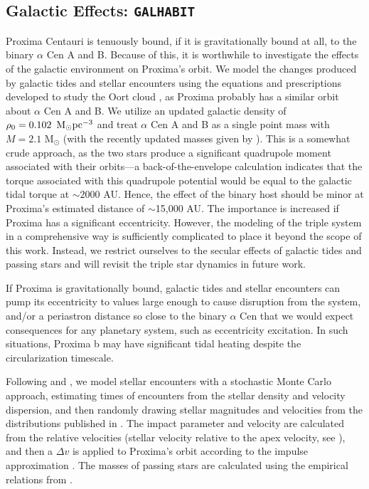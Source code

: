 \documentclass[preprint,12pt]{aastex}
\def\msun{{\rm\,M_\odot}}
\def\eg{{\it e.g.\ }}
\def\galhabit{\texttt{\footnotesize{GALHABIT}}\xspace}
\begin{document}
\subsection{Galactic Effects: \galhabit}
\label{sec:models:galhabit}
Proxima Centauri is tenuously bound, if it is gravitationally bound at all, to 
the binary $\alpha$ Cen A and B. Because of this, it is worthwhile
to investigate the effects of the galactic environment on 
Proxima's orbit. We model the changes produced by galactic tides 
and stellar encounters using the equations and prescriptions 
developed to study the Oort cloud \citep{Heisler1986, Heisler1987, Rickman2008}, as Proxima probably has a similar orbit about $\alpha$ Cen A and B. We utilize an updated galactic 
density of $\rho_0 = 0.102~\msun \rm{pc}^{-3}$ \citep{Holmberg2000} and treat 
$\alpha$ Cen A and B as a single point mass with $M = 2.1$ 
M$_{\odot}$ (with the recently updated masses given by 
\cite{PourbaixBoffin16}). This is a somewhat crude approach, as 
the two stars produce a significant quadrupole moment associated 
with their orbits---a back-of-the-envelope calculation indicates
that the torque associated with this quadrupole potential would 
be equal to the galactic tidal torque at $\sim 2000$ AU. Hence, 
the effect of the binary host should be minor 
at Proxima's estimated distance of $\sim$15,000 AU. The importance is increased if Proxima 
has a significant eccentricity. However, the modeling of the
triple system in a comprehensive way is sufficiently complicated
\citep[see, \eg][]{Harrington1968, Ford2000} to place it beyond 
the scope of this work. Instead, we restrict ourselves to the 
secular effects of galactic tides and passing stars 
and will revisit the triple star dynamics in future work. 

If Proxima is gravitationally bound, galactic tides and stellar 
encounters can pump its eccentricity to values large enough to 
cause disruption from the system, and/or a periastron distance 
so close to the binary $\alpha$ Cen that we would expect 
consequences for any planetary system, such as eccentricity 
excitation. In such situations, Proxima b may have significant tidal 
heating despite the circularization timescale. 

Following \cite{Heisler1987} and \cite{Rickman2008}, we model stellar
encounters with a stochastic Monte Carlo approach, estimating times 
of encounters from the stellar density and velocity dispersion, 
and then randomly drawing stellar magnitudes and velocities 
from the distributions published in \cite{Garciasanchez2001}. 
The impact parameter and velocity are calculated from the relative 
velocities (stellar velocity relative to the apex velocity, 
see \cite{Rickman2008}), and then a $\Delta v$ is applied to
Proxima's orbit according to the impulse approximation
\citep{Remy1985}. The masses of passing stars are calculated 
using the empirical relations from \cite{Reid2002}.
\end{document}
